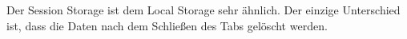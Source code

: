 
Der Session Storage ist dem Local Storage sehr ähnlich. Der einzige Unterschied ist, dass die Daten nach dem Schließen des Tabs gelöscht werden. 

